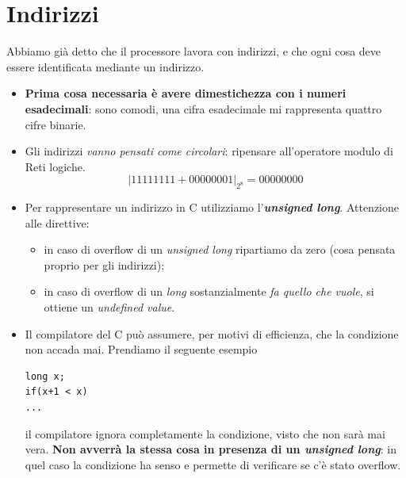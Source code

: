 \documentclass[11pt]{report}
\theoremstyle{definition}
\begin{document}
\section{Indirizzi}
Abbiamo già detto che il processore lavora con indirizzi, e che ogni cosa deve essere identificata mediante un indirizzo.
\begin{itemize}
\item \textbf{Prima cosa necessaria è avere dimestichezza con i numeri esadecimali}: sono comodi, una cifra esadecimale mi rappresenta quattro cifre binarie.
\item Gli indirizzi \emph{vanno pensati come circolari}: ripensare all'operatore modulo di Reti logiche.
\[|11111111+00000001|_{2^8}=00000000\]
\item Per rappresentare un indirizzo in C utilizziamo l'\emph{\textbf{unsigned long}}. Attenzione alle direttive:
\begin{itemize}
\item in caso di overflow di un \emph{unsigned long} ripartiamo da zero (cosa pensata proprio per gli indirizzi);
\item in caso di overflow di un \emph{long} sostanzialmente \emph{fa quello che vuole}, si ottiene un \emph{undefined value}.
\end{itemize}
\item Il compilatore del C può assumere, per motivi di efficienza, che la condizione non accada mai. Prendiamo il seguente esempio
\begin{verbatim}
long x;
if(x+1 < x)
...
\end{verbatim}
il compilatore ignora completamente la condizione, visto che non sarà mai vera. \textbf{Non avverrà la stessa cosa in presenza di un \emph{unsigned long}}: in quel caso la condizione ha senso e permette di verificare se c'è stato overflow.
\end{itemize}
\end{document}
